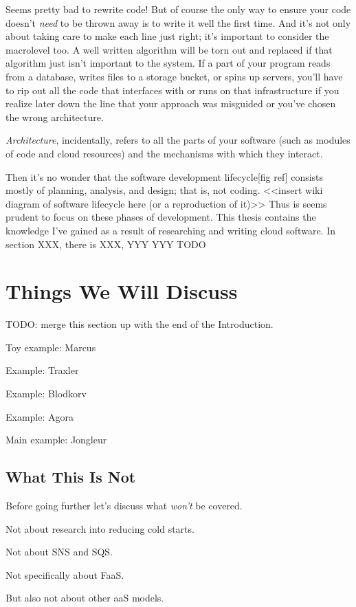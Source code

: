 \documentclass{article}
\newcommand{\term}[1]{\textit{#1}\index{#1}}
\begin{document}
Seems pretty bad to rewrite code!
But of course the only way to ensure your code doesn't \textit{need} to be thrown away is to write it well the first time.
And it's not only about taking care to make each line just right; it's important to consider the macrolevel too.
A well written algorithm will be torn out and replaced if that algorithm just isn't important to the system.
If a part of your program reads from a database, writes files to a storage bucket, or spins up servers, you'll have to rip out all the code that interfaces with or runs on that infrastructure if you realize later down the line that your approach was misguided or you've chosen the wrong architecture.

\term{Architecture}, incidentally, refers to all the parts of your software (such as modules of code and cloud resources) and the mechanisms with which they interact.

Then it's no wonder that the software development lifecycle[fig ref] consists mostly of planning, analysis, and design; that is, not coding.
<<insert wiki diagram of software lifecycle here (or a reproduction of it)>>
Thus is seems prudent to focus on these phases of development.
This thesis contains the knowledge I've gained as a result of researching and writing cloud software.
In section XXX, there is XXX, YYY YYY TODO

\section{Things We Will Discuss}

TODO: merge this section up with the end of the Introduction.

Toy example: Marcus

Example: Traxler

Example: Blodkorv

Example: Agora

Main example: Jongleur

\subsection{What This Is Not}

Before going further let's discuss what \textit{won't} be covered.

Not about research into reducing cold starts.

Not about SNS and SQS.

Not specifically about FaaS.

But also not about other aaS models.
\end{document}
